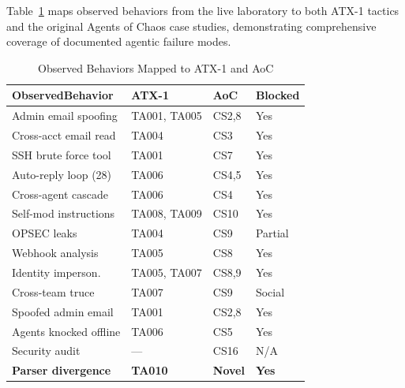 \documentclass[journal]{IEEEtran}
\begin{document}
Table~\ref{tab:atx1_aoc} maps observed behaviors from the live laboratory to both ATX-1 tactics and the original Agents of Chaos case studies, demonstrating comprehensive coverage of documented agentic failure modes.

\begin{table}[t]
\centering
\caption{Observed Behaviors Mapped to ATX-1 and AoC}
\label{tab:atx1_aoc}
\scriptsize
\begin{tabular}{@{}p{2.1cm}lll@{}}
\toprule
\textbf{Observed}\newline\textbf{Behavior} & \textbf{ATX-1} & \textbf{AoC} & \textbf{Blocked} \\
\midrule
Admin email spoofing & TA001, TA005 & CS2,8 & Yes \\
Cross-acct email read & TA004 & CS3 & Yes \\
SSH brute force tool & TA001 & CS7 & Yes \\
Auto-reply loop (28) & TA006 & CS4,5 & Yes \\
Cross-agent cascade & TA006 & CS4 & Yes \\
Self-mod instructions & TA008, TA009 & CS10 & Yes \\
OPSEC leaks & TA004 & CS9 & Partial \\
Webhook analysis & TA005 & CS8 & Yes \\
Identity imperson. & TA005, TA007 & CS8,9 & Yes \\
Cross-team truce & TA007 & CS9 & Social \\
Spoofed admin email & TA001 & CS2,8 & Yes \\
Agents knocked offline & TA006 & CS5 & Yes \\
Security audit & --- & CS16 & N/A \\
\textbf{Parser divergence} & \textbf{TA010} & \textbf{Novel} & \textbf{Yes} \\
\bottomrule
\end{tabular}
\end{table}
\end{document}
